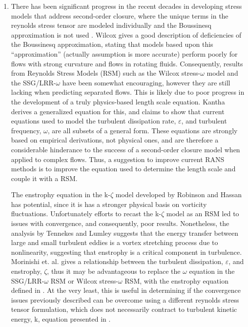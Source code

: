 \documentclass[a4paper]{article}
\begin{document}
\begin{enumerate}
  \item There has been significant progress in the recent decades in developing
    stress models that address second-order closure, where the unique terms in
    the reynolds stress tensor are modeled individually and the Boussinesq
    approximation is not used .  Wilcox\cite{wilcox} gives a good
    description of deficiencies of the Boussinesq approximation, stating that
    models based upon this ``approximation'' (actually assumption is more
    accurate) perform poorly for flows with strong curvature and flows in
    rotating fluids.  Consequently, results from Reynolds Stress Models (RSM)
    such as the Wilcox stress-$\omega$ model\cite{wilcox} and the
    SSG/LRR-$\omega$\cite{Cecora} have been somewhat encouraging, however they
    are still lacking when predicting separated flows.  This is likely due to
    poor progress in the development of a truly physics-based length scale
    equation.  Kantha\cite{Kantha} derives a generalized equation for this, and
    claims to show that current equations used to model the turbulent
    dissipation rate, $\varepsilon$, and turbulent frequency, $\omega$, are all
    subsets of a general form.  These equations are strongly based on empirical
    derivations, not physical ones, and are therefore a considerable hinderance
    to the success of a second-order closure model when applied to complex
    flows.  Thus, a suggestion to improve current RANS methods is to improve the
    equation used to determine the length scale and couple it with a RSM.
    
    The enstrophy equation in the k-$\zeta$ model developed by Robinson and
    Hassan\cite{Robinson} has potential, since it is has a stronger physical
    basis on vorticity fluctuations.  Unfortunately efforts to recast the
    k-$\zeta$ model as an RSM led to issues with convergence\cite{Xiao}, and
    consequently, poor results.  Nonetheless, the analysis by Tennekes and
    Lumley\cite{lumley} suggests that the energy transfer between large and
    small turbulent eddies is a vortex stretching process due to nonlinearity,
    suggesting that enstrophy is a critical component in turbulence.  Morinishi
    et. al. \cite{morinishi} gives a relationship between the turbulent
    dissipation, $\varepsilon$, and enstrophy, $\zeta$, thus it may be
    advantageous to replace the $\omega$ equation in the SSG/LRR-$\omega$ RSM or
    Wilcox stress-$\omega$ RSM, with the enstrophy equation defined in
    \cite{Xiao}.  At the very least, this is useful in determining if the
    convergence issues previously described can be overcome using a different
    reynolds stress tensor formulation, which does not necessarily contract to
    turbulent kinetic energy, k, equation presented in \cite{Robinson}.


\end{enumerate}
\end{document}
